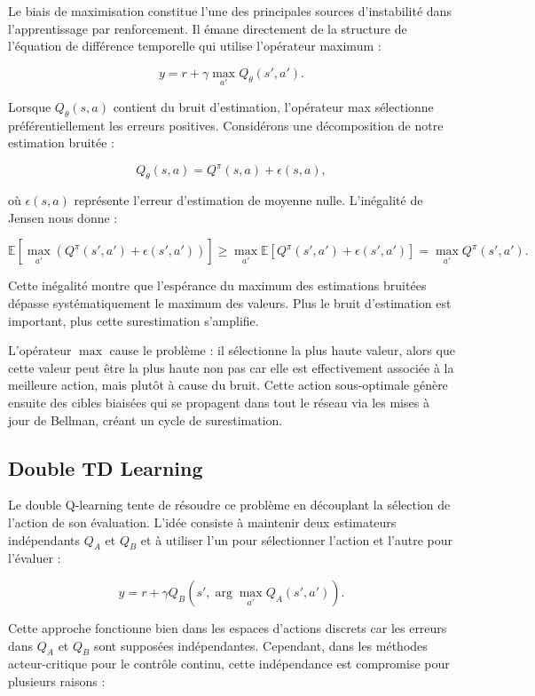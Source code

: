 \documentclass[a4paper, 12pt]{report}
\begin{document}
    Le biais de maximisation constitue l'une des principales sources
    d'instabilité dans l'apprentissage par renforcement. Il émane directement
    de la structure de l'équation de différence temporelle qui utilise
    l'opérateur maximum :

    $$
    y = r + \gamma \max_{a'} Q_\theta (s', a').
    $$

    Lorsque $Q_\theta (s, a)$ contient du bruit d'estimation, l'opérateur max
    sélectionne préférentiellement les erreurs positives. Considérons une
    décomposition de notre estimation bruitée :

    $$
    Q_\theta (s, a) = Q^\pi (s, a) + \epsilon (s, a),
    $$

    où $\epsilon (s, a)$ représente l'erreur d'estimation de moyenne nulle.
    L'inégalité de Jensen nous donne :

    $$
    \mathbb{E} [ \max_{a'} (Q^\pi (s', a') + \epsilon (s', a')) ] \geq \max_{a'} \mathbb{E} [ Q^\pi (s', a') + \epsilon (s', a')] = \max_{a'} Q^\pi (s', a').
    $$

    Cette inégalité montre que l'espérance du maximum des estimations bruitées
    dépasse systématiquement le maximum des valeurs. Plus le bruit d'estimation
    est important, plus cette surestimation s'amplifie.

    L'opérateur $\max$ cause le problème : il sélectionne la plus haute
    valeur, alors que cette valeur peut être la plus haute non pas car elle est
    effectivement associée à la meilleure action, mais plutôt à cause du
    bruit. Cette action sous-optimale génère ensuite des cibles biaisées qui se
    propagent dans tout le réseau via les mises à jour de Bellman, créant un
    cycle de surestimation.

    \subsection{Double TD Learning}

    Le double Q-learning \cite{hasselt2010doubleqlearning} tente de résoudre ce
    problème en découplant la sélection de l'action de son évaluation. L'idée
    consiste à maintenir deux estimateurs indépendants $Q_A$ et $Q_B$ et à
    utiliser l'un pour sélectionner l'action et l'autre pour l'évaluer :

    $$
    y = r + \gamma Q_B (s', \arg\max_{a'} Q_A (s', a')).
    $$

    Cette approche fonctionne bien dans les espaces d'actions discrets car les
    erreurs dans $Q_A$ et $Q_B$ sont supposées indépendantes. Cependant, dans
    les méthodes acteur-critique pour le contrôle continu, cette indépendance
    est compromise pour plusieurs raisons :
\end{document}
